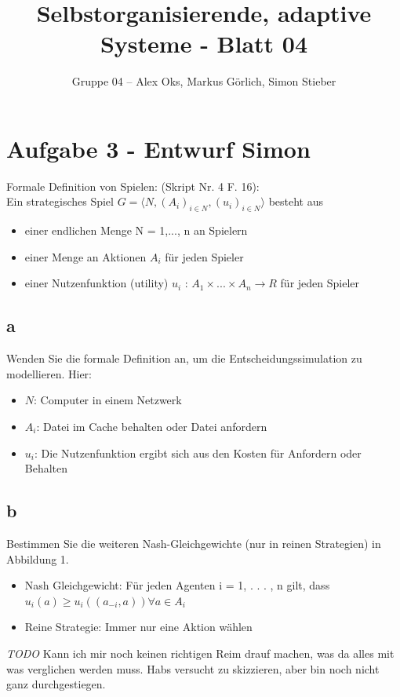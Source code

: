 \documentclass[10pt]{article}%
\theoremstyle{nonumberplain}
\begin{document}
\author{Gruppe 04 -- Alex Oks, Markus Görlich, Simon Stieber}
\title{Selbstorganisierende, adaptive Systeme - Blatt 04}

\maketitle %

\section{Aufgabe 3 - Entwurf Simon}
Formale Definition von Spielen: (Skript Nr. 4 F. 16):\\
Ein strategisches Spiel $G = \langle N, (A_i )_{i \in N} , (u_i )_{i \in N}\rangle$ besteht aus
\begin{itemize}
	\item einer endlichen Menge N = 1,..., n an Spielern
	\item einer Menge an Aktionen $A_i$ für jeden Spieler
	\item einer Nutzenfunktion (utility) $u_i$ : $A_1  \times ... \times A_n \rightarrow R$ für jeden
	Spieler
\end{itemize}
\subsection{a}
Wenden Sie die formale Definition an, um die Entscheidungssimulation zu modellieren.
Hier:
\begin{itemize}
	\item $N$: Computer in einem Netzwerk
	\item $A_i$: Datei im Cache behalten oder Datei anfordern
	\item $u_i$: Die Nutzenfunktion ergibt sich aus den Kosten für Anfordern oder Behalten 
\end{itemize}

\subsection{b}
Bestimmen Sie die weiteren Nash-Gleichgewichte (nur in reinen Strategien) in Abbildung 1.
\begin{itemize}
	\item Nash Gleichgewicht:
	Für jeden Agenten i = 1, . . . , n gilt, dass $u_i(a) \geq u_i ((a_{-i} , a )) \forall a \in A_i$
	\item Reine Strategie: Immer nur eine Aktion wählen
\end{itemize}
\emph{TODO} Kann ich mir noch keinen richtigen Reim drauf machen, was da alles mit was verglichen werden muss.
Habs versucht zu skizzieren, aber bin noch nicht ganz durchgestiegen.
\end{document}

